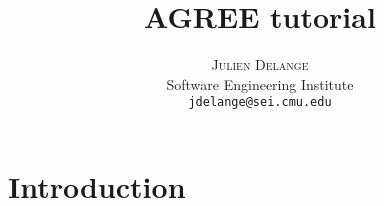 \documentclass[times, 10pt]{article}
\title{AGREE tutorial}
\author{\textsc{Julien Delange}\\
  Software Engineering Institute\\
  \texttt{jdelange@sei.cmu.edu}
}
\begin{document}
\maketitle

\section{Introduction}
\end{document}
